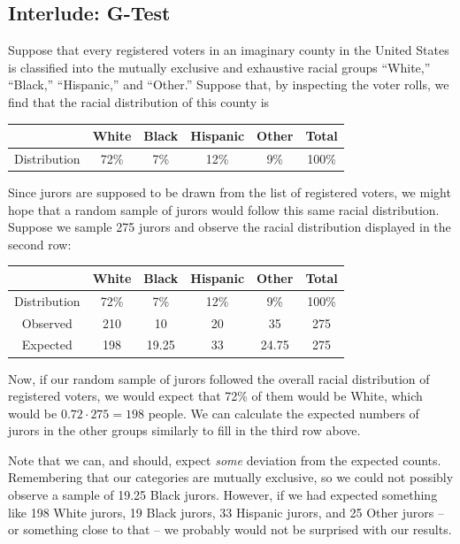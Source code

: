 \documentclass[letterpaper]{article}
\newcommand{\0}{\mathbf{0}}
\begin{document}
\subsection{Interlude: G-Test}
Suppose that every registered voters in an imaginary county in the United States is classified into the mutually exclusive and exhaustive racial groups ``White,'' ``Black,'' ``Hispanic,'' and ``Other.'' Suppose that, by inspecting the voter rolls, we find that the racial distribution of this county is 
\begin{center}
    \begin{tabular}{c|c c c c c}
            & White & Black & Hispanic & Other & Total \\
        \hline  
        Distribution & 72\% & 7\% & 12\% & 9\% & 100\%
    \end{tabular}
\end{center}
Since jurors are supposed to be drawn from the list of registered voters, we might hope that a random sample of jurors would follow this same racial distribution. Suppose we sample 275 jurors and observe the racial distribution displayed in the second row:
\begin{center}
    \begin{tabular}{c|c c c c c}
            & White & Black & Hispanic & Other & Total \\
        \hline  
        Distribution & 72\% & 7\% & 12\% & 9\% & 100\% \\ 
        Observed & 210 & 10 & 20 & 35 & 275 \\ 
        Expected & 198 & 19.25 & 33 & 24.75 & 275
    \end{tabular}
\end{center}
Now, if our random sample of jurors followed the overall racial distribution of registered voters, we would expect that 72\% of them would be White, which would be $0.72 \cdot 275 = 198$ people. We can calculate the expected numbers of jurors in the other groups similarly to fill in the third row above.

\bigskip 

Note that we can, and should, expect \emph{some} deviation from the expected counts. Remembering that our categories are mutually exclusive, so we could not possibly observe a sample of 19.25 Black jurors. However, if we had expected something like 198 White jurors, 19 Black jurors, 33 Hispanic jurors, and 25 Other jurors -- or something close to that -- we probably would not be surprised with our results.
\end{document}
